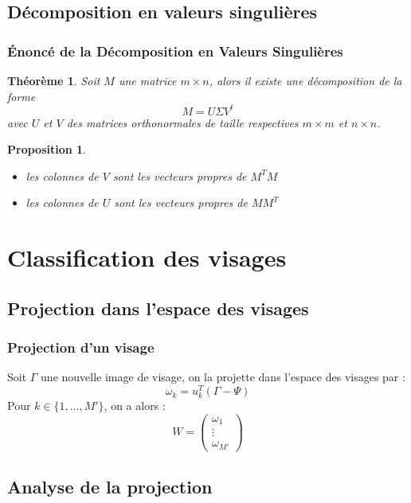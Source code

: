 \documentclass{beamer}
\theoremstyle{plain}
\newtheorem{thm}{Théorème}
\newtheorem{prop}{Proposition}
\theoremstyle{definition}
\begin{document}
\subsection{Décomposition en valeurs singulières}
\begin{frame}
  \frametitle{\'{E}noncé de la Décomposition en Valeurs Singulières}
  \begin{thm}
    Soit $M$ une matrice $m \times n$, alors il existe une décomposition de la forme
    \[
      M = U \Sigma V^t
    \]
    avec $U$ et $V$ des matrices orthonormales de taille respectives $m \times m$ et $n \times n$.
  \end{thm}
  
  \begin{prop}
    \begin{itemize}
    \item les colonnes de $V$ sont les vecteurs propres de $M^TM$
    \item les colonnes de $U$ sont les vecteurs propres de $MM^T$
    \end{itemize}
  \end{prop}
\end{frame}


\section{Classification des visages}
\subsection{Projection dans l'espace des visages}
\begin{frame}
  \frametitle{Projection d'un visage}
  Soit $\Gamma$ une nouvelle image de visage, on la projette dans l'espace des visages par :
  \[
    \omega_k = u_k^T(\Gamma - \Psi)
  \]
  \pause
  Pour $k \in \{1,\dotsc,M'\}$, on a alors :
  \[W =
    \begin{pmatrix}
      \omega_1 \\
      \vdots \\
      \omega_{M'}
    \end{pmatrix}
  \]
\end{frame}
\subsection{Analyse de la projection}

\begin{frame}
  
\end{frame}
\end{document}
